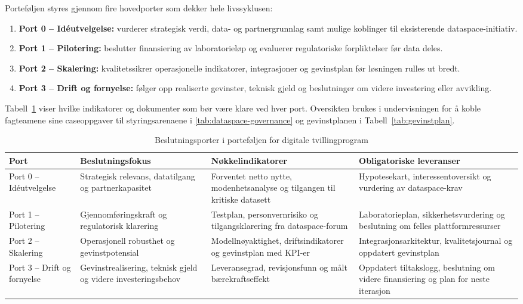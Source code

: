 Porteføljen styres gjennom fire hovedporter som dekker hele livssyklusen:
\begin{enumerate}
    \item \textbf{Port 0 – Idéutvelgelse:} vurderer strategisk verdi, data- og partnergrunnlag samt mulige koblinger til eksisterende dataspace-initiativ.
    \item \textbf{Port 1 – Pilotering:} beslutter finansiering av laboratorieløp og evaluerer regulatoriske forpliktelser før data deles.
    \item \textbf{Port 2 – Skalering:} kvalitetssikrer operasjonelle indikatorer, integrasjoner og gevinstplan før løsningen rulles ut bredt.
    \item \textbf{Port 3 – Drift og fornyelse:} følger opp realiserte gevinster, teknisk gjeld og beslutninger om videre investering eller avvikling.
\end{enumerate}

Tabell~\ref{tab:portefolje-porter} viser hvilke indikatorer og dokumenter som bør være klare ved hver port. Oversikten brukes i undervisningen for å koble fagteamene sine caseoppgaver til styringsarenaene i \autoref{tab:dataspace-governance} og gevinstplanen i Tabell~\ref{tab:gevinstplan}.

\begin{table}[h]
    \centering
    \caption{Beslutningsporter i porteføljen for digitale tvillingprogram}
    \label{tab:portefolje-porter}
    \begin{tabular}{p{2.8cm}p{3.8cm}p{3.4cm}p{3.4cm}}
        \toprule
        Port & Beslutningsfokus & Nøkkelindikatorer & Obligatoriske leveranser \\
        \midrule
        Port 0 – Idéutvelgelse & Strategisk relevans, datatilgang og partnerkapasitet & Forventet netto nytte, modenhetsanalyse og tilgangen til kritiske datasett & Hypotesekart, interessentoversikt og vurdering av dataspace-krav \\
        Port 1 – Pilotering & Gjennomføringskraft og regulatorisk klarering & Testplan, personvernrisiko og tilgangsklarering fra dataspace-forum & Laboratorieplan, sikkerhetsvurdering og beslutning om felles plattformressurser \\
        Port 2 – Skalering & Operasjonell robusthet og gevinstpotensial & Modellnøyaktighet, driftsindikatorer og gevinstplan med KPI-er & Integrasjonsarkitektur, kvalitetsjournal og oppdatert gevinstplan \\
        Port 3 – Drift og fornyelse & Gevinstrealisering, teknisk gjeld og videre investeringsbehov & Leveransegrad, revisjonsfunn og målt bærekraftseffekt & Oppdatert tiltakslogg, beslutning om videre finansiering og plan for neste iterasjon \\
        \bottomrule
    \end{tabular}
\end{table}

